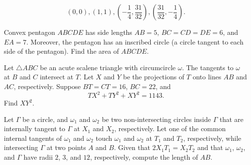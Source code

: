 \documentclass[11pt]{article}
\theoremstyle{definition}
\begin{document}
\begin{solution}[name={Solution by pieater314159}]
	$$(0,0),(1,1),\left(-\frac{1}{4},\frac{31}{32}\right),\left(\frac{31}{32},-\frac{1}{4}\right).$$
\end{solution}




\begin{question}[name={2020 AIME II, \href{https://artofproblemsolving.com/community/c4p15680983}{Problem 13}}]
	Convex pentagon $ABCDE$ has side lengths $AB=5$, $BC=CD=DE=6$, and $EA=7$. Moreover, the pentagon has an inscribed circle (a circle tangent to each side of the pentagon). Find the area of $ABCDE$.
\end{question}


%	












\begin{question}[name={2020 AIME II, \href{https://artofproblemsolving.com/community/c4p15680911}{Problem 15}}]
	Let $\triangle ABC$ be an acute scalene triangle with circumcircle $\omega$. The tangents to $\omega$ at $B$ and $C$ intersect at $T$. Let $X$ and $Y$ be the projections of $T$ onto lines $AB$ and $AC$, respectively. Suppose $BT=CT=16$, $BC=22$, and $$TX^2+TY^2+XY^2=1143.$$ Find $XY^2$.
\end{question}


%	


\begin{question}[name={2020 HMMT, Geometry, \href{https://artofproblemsolving.com/community/c129h2008244p14065144}{Problem 7}}]
	Let $\Gamma$ be a circle, and $\omega_1$ and $\omega_2$ be two non-intersecting circles inside $\Gamma$ that are internally tangent to $\Gamma$ at $X_1$ and $X_2$, respectively. Let one of the common internal tangents of $\omega_1$ and $\omega_2$ touch $\omega_1$ and $\omega_2$ at $T_1$ and $T_2$, respectively, while intersecting $\Gamma$ at two points $A$ and $B$. Given that $2X_1T_1=X_2T_2$ and that $\omega_1$, $\omega_2$, and $\Gamma$ have radii $2$, $3$, and $12$, respectively, compute the length of $AB$.
\end{question}
\end{document}
